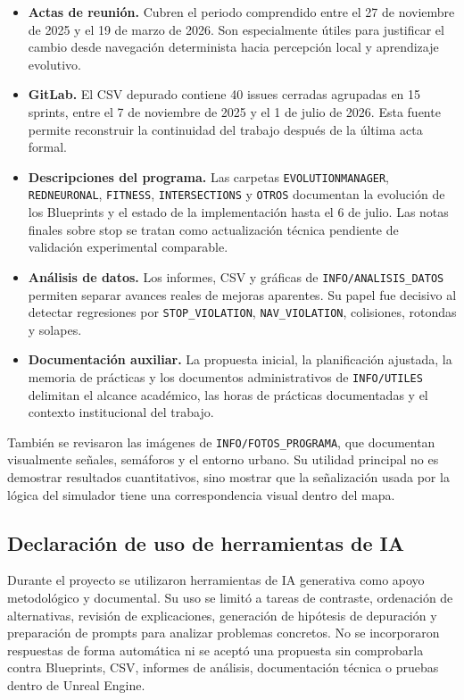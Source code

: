 \begin{itemize}
  \item \textbf{Actas de reunión.} Cubren el periodo comprendido entre el 27 de noviembre de 2025 y el 19 de marzo de 2026. Son especialmente útiles para justificar el cambio desde navegación determinista hacia percepción local y aprendizaje evolutivo.
  \item \textbf{GitLab.} El CSV depurado contiene 40 issues cerradas agrupadas en 15 sprints, entre el 7 de noviembre de 2025 y el 1 de julio de 2026. Esta fuente permite reconstruir la continuidad del trabajo después de la última acta formal.
  \item \textbf{Descripciones del programa.} Las carpetas \texttt{EVOLUTIONMANAGER}, \texttt{REDNEURONAL}, \texttt{FITNESS}, \texttt{INTERSECTIONS} y \texttt{OTROS} documentan la evolución de los Blueprints y el estado de la implementación hasta el 6 de julio. Las notas finales sobre stop se tratan como actualización técnica pendiente de validación experimental comparable.
  \item \textbf{Análisis de datos.} Los informes, CSV y gráficas de \texttt{INFO/ANALISIS\_DATOS} permiten separar avances reales de mejoras aparentes. Su papel fue decisivo al detectar regresiones por \texttt{STOP\_VIOLATION}, \texttt{NAV\_VIOLATION}, colisiones, rotondas y solapes.
  \item \textbf{Documentación auxiliar.} La propuesta inicial, la planificación ajustada, la memoria de prácticas y los documentos administrativos de \texttt{INFO/UTILES} delimitan el alcance académico, las horas de prácticas documentadas y el contexto institucional del trabajo.
\end{itemize}

También se revisaron las imágenes de \texttt{INFO/FOTOS\_PROGRAMA}, que documentan visualmente señales, semáforos y el entorno urbano. Su utilidad principal no es demostrar resultados cuantitativos, sino mostrar que la señalización usada por la lógica del simulador tiene una correspondencia visual dentro del mapa.

\subsection{Declaración de uso de herramientas de IA}

Durante el proyecto se utilizaron herramientas de IA generativa como apoyo metodológico y documental. Su uso se limitó a tareas de contraste, ordenación de alternativas, revisión de explicaciones, generación de hipótesis de depuración y preparación de prompts para analizar problemas concretos. No se incorporaron respuestas de forma automática ni se aceptó una propuesta sin comprobarla contra Blueprints, CSV, informes de análisis, documentación técnica o pruebas dentro de Unreal Engine.

